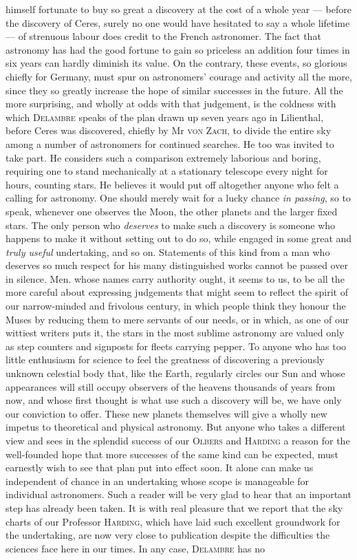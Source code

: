 himself fortunate to buy so great a discovery at the cost of a whole year --- before the discovery of Ceres, surely no one would have hesitated to say a whole lifetime --- of strenuous labour does credit to the French
astronomer. The fact that astronomy has had the good fortune to gain so priceless an addition four times in six years can hardly diminish its value. On the contrary, these events, so glorious chiefly for Germany, must spur on astronomers’ courage and activity all the more, since they so greatly increase the hope of similar successes in the future. All the more surprising, and wholly at odds with that judgement, is the coldness with which \textsc{Delambre} speaks of the plan drawn up seven years ago in Lilienthal, before Ceres was discovered, chiefly by Mr \textsc{von Zach}, to divide the entire sky among a number of astronomers for continued searches. He too was invited to take part. He considers such a comparison extremely laborious and boring, requiring one to stand mechanically at a stationary telescope every night for hours, counting stars. He believes it would put off altogether anyone who felt a calling for astronomy. One should merely wait for a lucky chance \emph{in passing}, so to speak, whenever one observes the Moon, the other planets and the larger fixed stars. The only person who \emph{deserves} to make such a discovery is someone who happens to make it without setting out to do so, while engaged in some great and \emph{truly useful} undertaking, and so on. Statements of this kind from a man who deserves so much respect for his many distinguished works cannot be passed over in silence. Men. whose names carry authority ought, it seems to us, to be all the more careful about expressing judgements that might seem to reflect the spirit of our narrow-minded and frivolous century, in which people think they honour the Muses by reducing them to mere servants of our needs, or in which, as one of our wittiest writers puts it, the stars in the most sublime astronomy are valued only as step counters and signposts for fleets carrying pepper. To anyone who has too little enthusiasm for science to feel the greatness of discovering a previously unknown celestial body that, like the Earth, regularly circles our Sun and whose appearances will still occupy observers of the heavens thousands of years from now, and whose first thought is what use such a discovery will be, we have only our conviction to offer. These new planets themselves will give a wholly new impetus to theoretical and physical astronomy. But anyone who takes a different view and sees in the splendid success of our \textsc{Olbers} and \textsc{Harding} a reason for the well-founded hope that more successes of the same kind can be expected, must earnestly wish to see that plan put into effect soon. It alone can make us independent of chance in an undertaking whose scope is manageable for individual astronomers. Such a reader will be very glad to hear that an important step has already been taken. It is with real pleasure that we report that the sky charts of our Professor \textsc{Harding}, which have laid such excellent groundwork for the undertaking, are now very close to publication despite the difficulties the sciences face here in our times. In any case, \textsc{Delambre} has no 